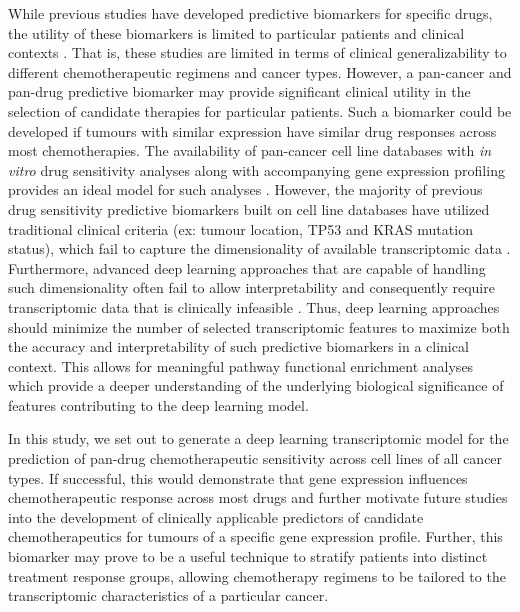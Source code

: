 \documentclass[10pt, letterpaper, twocolumn]{article}
\begin{document}
While previous studies have developed predictive biomarkers for specific drugs, the utility of these biomarkers is limited to particular patients and clinical contexts \cite{drug_sense}. That is, these studies are limited in terms of clinical generalizability to different chemotherapeutic regimens and cancer types. However, a pan-cancer and pan-drug predictive biomarker may provide significant clinical utility in the selection of candidate therapies for particular patients. Such a biomarker could be developed if tumours with similar expression have similar drug responses across most chemotherapies. The availability of pan-cancer cell line databases with \textit{in vitro} drug sensitivity analyses along with accompanying gene expression profiling provides an ideal model for such analyses \cite{gdsc}. However, the majority of previous drug sensitivity predictive biomarkers built on cell line databases have utilized traditional clinical criteria (ex: tumour location, TP53 and KRAS mutation status), which fail to capture the dimensionality of available transcriptomic data \cite{colorectal,gi,lung,breast}. Furthermore, advanced deep learning approaches that are capable of handling such dimensionality often fail to allow interpretability and consequently require transcriptomic data that is clinically infeasible \cite{ml_oncol}. Thus, deep learning approaches should minimize the number of selected transcriptomic features to maximize both the accuracy and interpretability of such predictive biomarkers in a clinical context. This allows for meaningful pathway functional enrichment analyses which provide a deeper understanding of the underlying biological significance of features contributing to the deep learning model.

In this study, we set out to generate a deep learning transcriptomic model for the prediction of pan-drug chemotherapeutic sensitivity across cell lines of all cancer types. If successful, this would demonstrate that gene expression influences chemotherapeutic response across most drugs and further motivate future studies into the development of clinically applicable predictors of candidate chemotherapeutics for tumours of a specific gene expression profile. Further, this biomarker may prove to be a useful technique to stratify patients into distinct treatment response groups, allowing chemotherapy regimens to be tailored to the transcriptomic characteristics of a particular cancer. 
\end{document}
